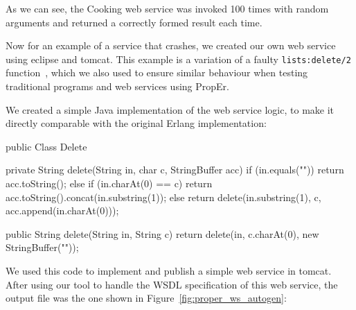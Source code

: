 \documentclass[submission,copyright]{eptcs}
\begin{document}
As we can see, the Cooking web service was invoked 100 times with random 
arguments and returned a correctly formed result each time.

Now for an example of a service that crashes, we created our own web
service using eclipse and tomcat. This example is a variation of a
faulty \texttt{lists:delete/2} function~\cite{PropErTypes@Erlang-11},
which we also used to ensure similar behaviour when testing
traditional programs and web services using PropEr.

We created a simple Java implementation of the web service logic, to
make it directly comparable with the original Erlang implementation:
\begin{lstjava}
public Class Delete {
    private String delete(String in, char c, StringBuffer acc) {
        if (in.equals("")) {
            return acc.toString();
        }
        else if (in.charAt(0) == c) {
            return acc.toString().concat(in.substring(1));
        }
        else {
            return delete(in.substring(1), c, acc.append(in.charAt(0)));
        }
    }
    
    public String delete(String in, String c) {
        return delete(in, c.charAt(0), new StringBuffer(""));
    } 
}
\end{lstjava}

We used this code to implement and publish a simple web service in
tomcat. After using our tool to handle the WSDL specification of this
web service, the output file was the one shown in
Figure~\ref{fig:proper_ws_autogen}:
\end{document}
